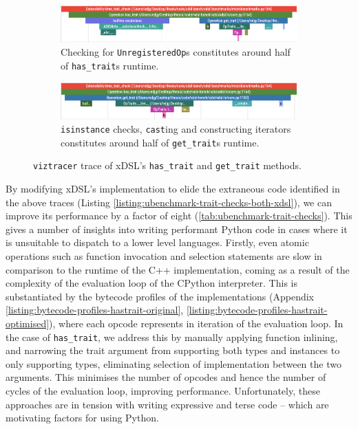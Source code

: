 \begin{figure}[H]
    \centering
    \begin{subfigure}[b]{\textwidth}
        \centering
        \includegraphics[width=\textwidth]{images/14_understanding_compiler_performance/trait_checks/hastrait_xdsl_viztracer.png}
        \caption{Checking for \texttt{UnregisteredOp}s constitutes around half of \texttt{has_trait}s runtime.}
        \label{fig:ubenchmark-hastrait-xdsl-viztracer}
    \end{subfigure}
    \begin{subfigure}[b]{\textwidth}
        \centering
        \includegraphics[width=\textwidth]{images/14_understanding_compiler_performance/trait_checks/gettrait_xdsl_viztracer.png}
        \caption{\texttt{isinstance} checks, \texttt{cast}ing and constructing iterators constitutes around half of \texttt{get_trait}s runtime.}
        \label{fig:ubenchmark-gettrait-xdsl-viztracer}
    \end{subfigure}
    \caption{\texttt{viztracer} trace of xDSL's \texttt{has_trait} and \texttt{get_trait} methods.}
    \label{fig:ubenchmark-hasgettrait-xdsl-viztracer}
\end{figure}

By modifying xDSL's implementation to elide the extraneous code identified in the above traces (Listing \ref{listing:ubenchmark-trait-checks-both-xdsl}), we can improve its performance by a factor of eight (\autoref{tab:ubenchmark-trait-checks}).
This gives a number of insights into writing performant Python code in cases where it is unsuitable to dispatch to a lower level languages.
Firstly, even atomic operations such as function invocation and selection statements are slow in comparison to the runtime of the C++ implementation, coming as a result of the complexity of the evaluation loop of the CPython interpreter. %
This is substantiated by the bytecode profiles of the implementations (Appendix \ref{listing:bytecode-profiles-hastrait-original}, \ref{listing:bytecode-profiles-hastrait-optimised}), where each opcode represents in iteration of the evaluation loop.
In the case of \texttt{has_trait}, we address this by manually applying function inlining, and narrowing the trait argument from supporting both types and instances to only supporting types, eliminating selection of implementation between the two arguments. This minimises the number of opcodes and hence the number of cycles of the evaluation loop, improving performance.
Unfortunately, these approaches are in tension with writing expressive and terse code -- which are motivating factors for using Python.

